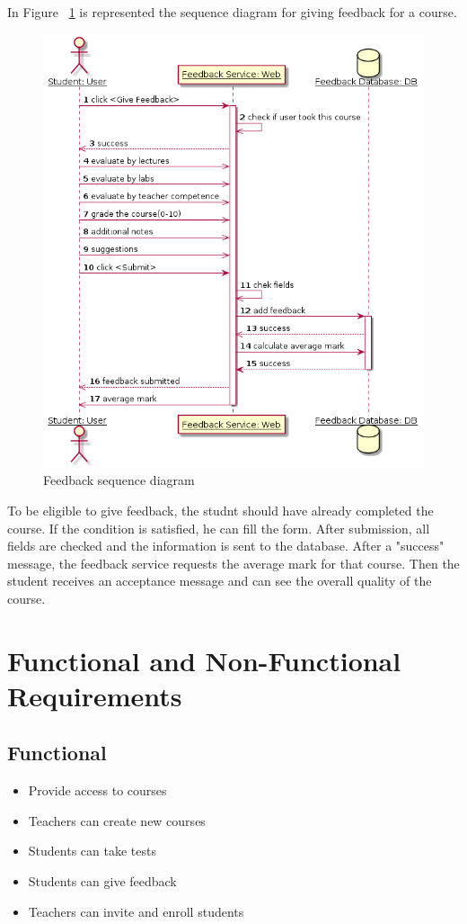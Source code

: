 \documentclass[12pt,a4paper,titlepage]{article}
\begin{document}
In Figure ~\ref{fig:feedback} is represented the sequence diagram for giving feedback for a course.
\begin{figure}[H]
\centering
\includegraphics[width=\textwidth]{feedback}
\caption{Feedback sequence diagram}
\label{fig:feedback}
\end{figure}
To be eligible to give feedback, the studnt should have already completed the course. If the condition is satisfied, he can fill the form. After submission, all fields are checked and the information is sent to the database. After a "success" message, the feedback service requests the average mark for that course. Then the student receives an acceptance message and can see the overall quality of the course.

\section{Functional and Non-Functional Requirements}
\subsection{Functional}
\begin{itemize}
	\item Provide access to courses
	\item Teachers can create new courses
	\item Students can take tests
	\item Students can give feedback
	\item Teachers can invite and enroll students
\end{itemize}
\end{document}
